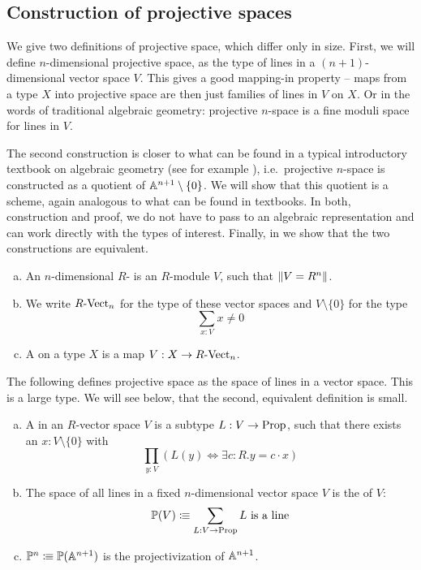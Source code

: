 
\subsection{Construction of projective spaces}
We give two definitions of projective space, which differ only in size.
First, we will define $n$-dimensional projective space,
as the type of lines in a $(n+1)$-dimensional vector space $V$.
This gives a good mapping-in property --
maps from a type $X$ into projective space are then just families of lines in $V$ on $X$.
Or in the words of traditional algebraic geometry:
projective $n$-space is a fine moduli space for lines in $V$.

The second construction is closer to what can be found in a typical
introductory textbook on algebraic geometry
(see for example \cite[Section I.2]{Hartshorne}),
i.e.\ projective $n$-space is constructed as a quotient of $\mathbb{A}^{n+1}\setminus\{0\}$.
We will show that this quotient is a scheme,
again analogous to what can be found in textbooks.
In both, construction and proof,
we do not have to pass to an algebraic representation
and can work directly with the types of interest.
Finally, in 
we show that the two constructions are equivalent.

\begin{definition}%
  \begin{enumerate}[(a)]
  \item An $n$-dimensional $R$- is an $R$-module $V$,
    such that $\lVert  V = R^n  \rVert$. 
  \item We write $R\text{-}\mathrm{Vect}_{n}$ for the type of these vector spaces and $V\setminus\{0\}$ for the type
    \[ \sum_{x:V}x\neq 0\]
  \item A  on a type $X$ is a map $V:X\to R\text{-}\mathrm{Vect}_{n}$. 
  \end{enumerate}
\end{definition}

The following defines projective space as the space of lines in a vector space.
This is a large type.
We will see below, that the second, equivalent definition is small.

\begin{definition}%
  \label{projective-space-as-space-of-lines}
  \begin{enumerate}[(a)]
  \item A  in an $R$-vector space $V$ is a subtype $L:V\to \mathrm{Prop}$,
    such that there exists an $x:V\setminus\{0\}$ with
    \[ \prod_{y:V}\left(L (y) \Leftrightarrow \exists c:R.y=c\cdot x\right)\]
  \item The space of all lines in a fixed $n$-dimensional vector space $V$ is the  of $V$:
    \[ \mathbb{P}(V)\vcentcolon\mspace{-1.2mu}\equiv \sum_{L:V\to \mathrm{Prop}} L \text{ is a line}  \]
  \item {} $\mathbb{P}^n \vcentcolon\mspace{-1.2mu}\equiv \mathbb{P}(\mathbb{A}^{n+1})$ is the projectivization of $\mathbb{A}^{n+1}$.
  \end{enumerate}
\end{definition}

